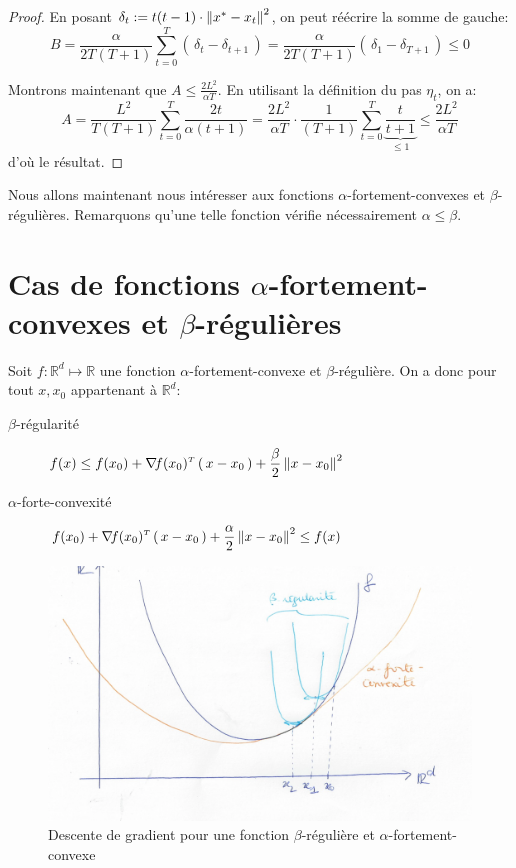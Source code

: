 \documentclass[11pt]{article}
\newcommand{\transpose}[1]{\ensuremath{#1^{\scriptscriptstyle T}}}
\newcommand{\dotpourvariable}{\:\cdot\:}
\newcommand{\ifempty}[3]{\ifx\hfuzz#1\hfuzz #2 \else #3\fi}
\newcommand{\norme}[1]{\left\lVert\ifempty{#1}{\dotpourvariable}{#1}\right\rVert}
\newcommand{\prt}[1]{\left( \, #1  \, \right)}
\newcommand{\R}{\mathbb{R}} %
\begin{document}
\begin{proof}
En posant $\delta_t := t(t-1) \cdot \norme{x^{*}-x_t}^2$, on peut réécrire la somme
 de gauche:
\begin{equation*}
B= \frac{\alpha}{2T(T+1)} \sum_{t=0}^T \prt{\delta_t-\delta_{t+1}}
=\frac{\alpha}{2T(T+1)} \prt{\delta_1-\delta_{T+1}}
\leq 0
\end{equation*}

Montrons maintenant que $A \leq \frac{2 L^2}{\alpha T}$. En utilisant la définition
 du pas $\eta_t$, on a:
 \begin{equation*}
   A= \frac{L^2}{T(T+1)} \sum_{t=0}^T \frac{2t}{\alpha (t+1)}
   = \frac{2L^2}{\alpha T} \cdot  \frac{1}{(T+1)}\sum_{t=0}^T \underbrace{\frac{t}{t+1}}_{\leq 1} \leq \frac{2L^2}{\alpha T}
 \end{equation*}
d'où le résultat.
\end{proof}

Nous allons maintenant nous intéresser aux fonctions $\alpha$-fortement-convexes et
 $\beta$-régulières. Remarquons qu'une telle fonction vérifie nécessairement $\alpha \leq \beta$.

 \section{Cas de fonctions $\alpha$-fortement-convexes et
  $\beta$-régulières}

  Soit $f: \R^d \mapsto \R$ une fonction $\alpha$-fortement-convexe et
   $\beta$-régulière. On a donc pour tout $x, x_0$ appartenant à $\R^d$:
   \begin{description}
     \item[$\beta$-régularité] $\displaystyle f(x) \leq f(x_0)+ \transpose{\nabla\! f(x_0)}\prt{x-x_0}+ \frac{\beta}{2}\norme{x-x_0}^2$
     \item[$\alpha$-forte-convexité] $\displaystyle f(x_0)+ \transpose{\nabla\! f(x_0)}\prt{x-x_0}+ \frac{\alpha}{2}\norme{x-x_0}^2 \leq  f(x) $
   \end{description}


	 \begin{figure}[H]
	\begin{center}
	\includegraphics[scale=0.25]{schema.png}
	\caption{Descente de gradient pour une fonction $\beta$-régulière et $\alpha$-fortement-convexe}
	\label{ICC_1}
	\end{center}
	\end{figure}
\end{document}
